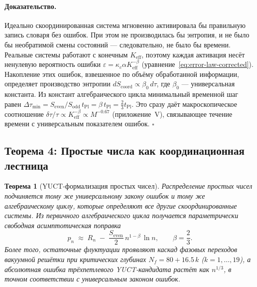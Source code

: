 \documentclass[12pt,a4paper]{article}
\newtheorem{theorem}{Теорема}[section]
\theoremstyle{remark}
\renewenvironment{proof}{\paragraph{Доказательство.}}{\hfill$\square$}
\newcommand{\tPl}{t_{\mathrm{Pl}}}
\newcommand{\Scoord}{S_{\mathrm{coord}}}
\begin{document}
	\begin{proof}
		Идеально скоординированная система мгновенно активировала бы правильную запись словаря без ошибок. При этом не производилась бы энтропия, и не было бы необратимой смены состояний --- следовательно, не было бы времени. Реальные системы работают с конечным \(K_{\mathrm{eff}}\), поэтому каждая активация несёт ненулевую вероятность ошибки \(\varepsilon = \kappa_c \alpha K_{\mathrm{eff}}^{-\beta}\) (уравнение~\ref{eq:error-law-corrected}). Накопление этих ошибок, взвешенное по объёму обработанной информации, определяет производство энтропии \(d\Scoord \propto \beta_0 \, d\tau\), где \(\beta_0\) --- универсальная константа. Из констант алгебраического цикла минимальный временной шаг равен \(\Delta \tau_{\min} = S_{\mathrm{even}}/S_{\mathrm{odd}} \, \tPl = \beta \, \tPl = \frac{2}{3} \tPl\). Это сразу даёт макроскопическое соотношение \(\delta\tau/\tau \propto K_{\mathrm{eff}}^{-\beta} \propto M^{-0.67}\) (приложение~V), связывающее течение времени с универсальным показателем ошибок.
	\end{proof}
	
	\subsection{Теорема 4: Простые числа как координационная лестница}
	
	\begin{theorem}[YUCT-формализация простых чисел]\label{thm:prime}
		Распределение простых чисел подчиняется тому же универсальному закону ошибок и тому же алгебраическому циклу, которые определяют все другие скоординированные системы. Из первичного алгебраического цикла получается параметрически свободная асимптотическая поправка
		\begin{equation}\label{eq:yuct-prime-theorem}
			\boxed{ p_n \;\approx\; R_n \;-\; \frac{S_{\mathrm{even}}}{2}\,
				n^{1-\beta}\,\ln n },
			\qquad \beta = \frac{2}{3}.
		\end{equation}
		Более того, остаточные флуктуации проявляют каскад фазовых переходов вакуумной решётки при критических глубинах \(N_f = 80 + 16.5\,k\) (\(k=1,\dots,19\)), а абсолютная ошибка трёхпетлевого YUCT-кандидата растёт как \(n^{1/3}\), в точном соответствии с универсальным законом ошибок.
	\end{theorem}
	
\end{document}
